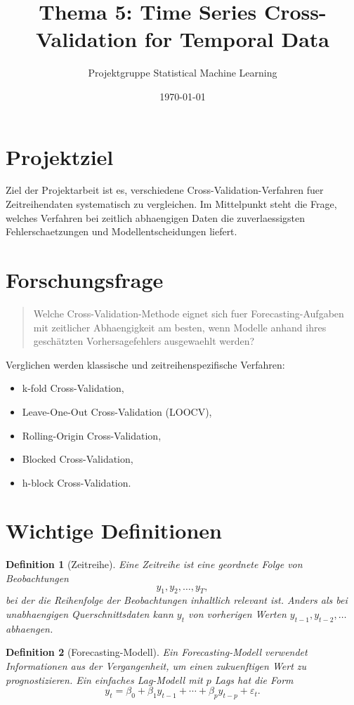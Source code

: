 \documentclass[11pt,a4paper]{article}
\title{Thema 5: Time Series Cross-Validation for Temporal Data}
\author{Projektgruppe Statistical Machine Learning}
\date{\today}
\newtheorem{definition}{Definition}
\begin{document}
\maketitle

\section{Projektziel}

Ziel der Projektarbeit ist es, verschiedene Cross-Validation-Verfahren fuer
Zeitreihendaten systematisch zu vergleichen. Im Mittelpunkt steht die Frage,
welches Verfahren bei zeitlich abhaengigen Daten die zuverlaessigsten
Fehlerschaetzungen und Modellentscheidungen liefert.

\section{Forschungsfrage}

\begin{quote}
Welche Cross-Validation-Methode eignet sich fuer Forecasting-Aufgaben mit
zeitlicher Abhaengigkeit am besten, wenn Modelle anhand ihres geschätzten
Vorhersagefehlers ausgewaehlt werden?
\end{quote}

Verglichen werden klassische und zeitreihenspezifische Verfahren:
\begin{itemize}
  \item k-fold Cross-Validation,
  \item Leave-One-Out Cross-Validation (LOOCV),
  \item Rolling-Origin Cross-Validation,
  \item Blocked Cross-Validation,
  \item h-block Cross-Validation.
\end{itemize}

\section{Wichtige Definitionen}

\begin{definition}[Zeitreihe]
Eine Zeitreihe ist eine geordnete Folge von Beobachtungen
\[
  y_1, y_2, \ldots, y_T,
\]
bei der die Reihenfolge der Beobachtungen inhaltlich relevant ist. Anders als
bei unabhaengigen Querschnittsdaten kann $y_t$ von vorherigen Werten
$y_{t-1}, y_{t-2}, \ldots$ abhaengen.
\end{definition}

\begin{definition}[Forecasting-Modell]
Ein Forecasting-Modell verwendet Informationen aus der Vergangenheit, um einen
zukuenftigen Wert zu prognostizieren. Ein einfaches Lag-Modell mit $p$ Lags hat
die Form
\[
  y_t = \beta_0 + \beta_1 y_{t-1} + \cdots + \beta_p y_{t-p} + \varepsilon_t.
\]
\end{definition}
\end{document}
